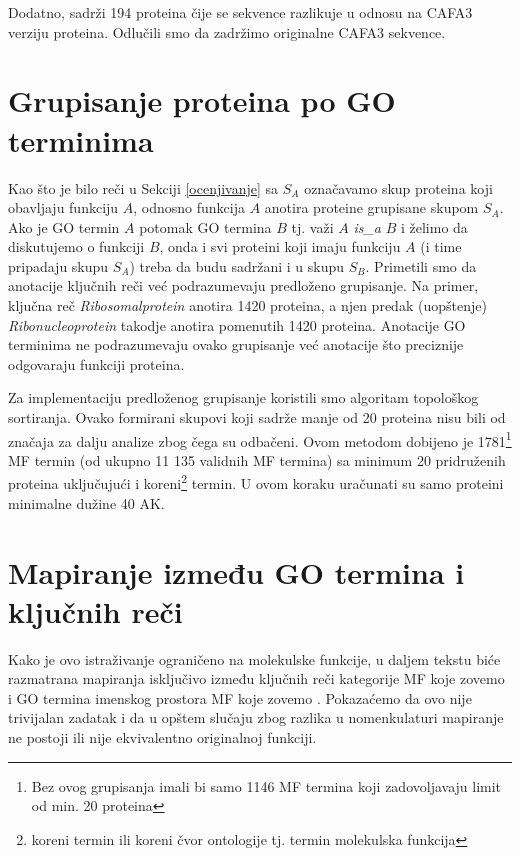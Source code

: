 Dodatno, \swissprot sadrži 194 proteina čije se sekvence razlikuje u
odnosu na CAFA3 verziju proteina. Odlučili smo da zadržimo originalne CAFA3
sekvence.

\section{Grupisanje proteina po GO terminima}
\label{grupisanje}

Kao što je bilo reči u Sekciji \ref{ocenjivanje} sa $S_A$ označavamo skup
proteina koji obavljaju funkciju $A$, odnosno funkcija $A$ anotira proteine
grupisane skupom $S_A$.
Ako je GO termin $A$ potomak GO termina $B$ tj. važi $A$ \textit{is\_a} $B$ i
želimo da diskutujemo o funkciji $B$, onda i svi proteini koji imaju funkciju
$A$ (i time pripadaju skupu $S_A$) treba da budu sadržani i u skupu $S_B$.
Primetili smo da anotacije ključnih reči već podrazumevaju predloženo grupisanje.
Na primer, ključna reč \textit{Ribosomalprotein} anotira 1420 proteina, a
njen predak (uopštenje) \textit{Ribonucleoprotein} takodje anotira pomenutih 1420 proteina.
Anotacije GO terminima ne podrazumevaju ovako grupisanje već anotacije što
preciznije odgovaraju funkciji proteina. 
 
Za implementaciju predloženog grupisanje koristili smo algoritam topološkog
sortiranja. Ovako formirani skupovi koji sadrže manje od 20 proteina nisu bili
od značaja za dalju analize zbog čega su odbačeni.
Ovom metodom dobijeno je 1781\footnote{Bez ovog grupisanja imali bi samo 1146
MF termina  koji zadovoljavaju limit od min.  20 proteina} MF termin (od ukupno
11 135 validnih MF termina) sa minimum 20 pridruženih proteina uključujući i
koreni\footnote{koreni termin ili koreni čvor ontologije tj.  termin molekulska
funkcija} termin. U ovom koraku uračunati su samo proteini minimalne dužine 40
AK.

\section{Mapiranje između GO termina i \swissprot ključnih reči}
\label{kw2go_mapiranje}

Kako je ovo istraživanje ograničeno na molekulske funkcije, u daljem tekstu biće
razmatrana mapiranja isključivo između ključnih reči kategorije MF koje zovemo
 i GO termina imenskog prostora MF koje zovemo
. Pokazaćemo da ovo nije trivijalan zadatak i da u opštem
slučaju zbog razlika u nomenkulaturi mapiranje ne postoji ili nije ekvivalentno
originalnoj funkciji.

